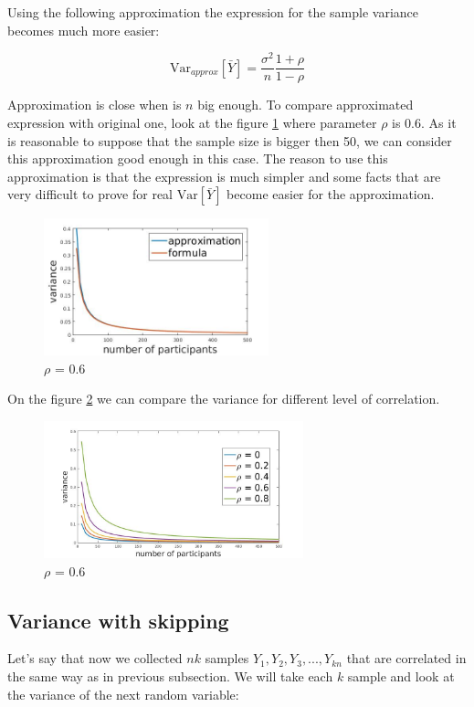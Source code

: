 \documentclass[12pt]{report}
\begin{document}
Using the following approximation the expression for the sample variance becomes much more easier:

$$\mathrm{Var}_{approx}\left[\bar{Y} \right] = \frac{\sigma^2}{n} \frac{1+\rho}{1-\rho}$$


Approximation is close when is $n$ big enough. To compare approximated expression with original one, look at the figure \ref{fig:lineGame1} where parameter $\rho$ is $0.6$. As it is reasonable to suppose that the sample size is bigger then 50, we can consider this approximation good enough in this case. The reason to use this approximation is that the expression is much simpler and some facts that are very difficult to prove for real $\mathrm{Var}\left[\bar{Y} \right]$ become easier for the approximation.

\begin{figure}[ht]
    \centering
    \includegraphics[height=150px]{lineGame1}
    \caption{ $\rho$ = 0.6 }
    \label{fig:lineGame1}
\end{figure}

On the figure \ref{fig:diffCorr} we can compare the variance for different level of correlation.


\begin{figure}[ht]
    \centering
    \includegraphics[height=150px]{varianceIndDep2}
    \caption{ $\rho$ = 0.6 }
    \label{fig:diffCorr}
\end{figure}


\subsection{Variance with skipping}

Let's say that now we collected $nk$ samples $Y_1, Y_2, Y_3, ..., Y_{kn}$ that are correlated in the same way as in previous subsection. We  will take each $k$ sample and look at the variance of the next random variable:
\end{document}
